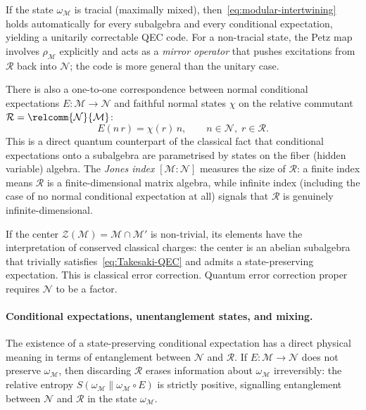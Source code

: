 \documentclass[a4paper,11pt]{article}
\theoremstyle{definition}
\begin{document}
If the state $\omega_\mathcal{M}$ is tracial (maximally mixed), then~\eqref{eq:modular-intertwining}
holds automatically for every subalgebra and every conditional expectation, yielding a
unitarily correctable QEC code.  For a non-tracial state, the Petz map involves $\rho_\mathcal{M}$
explicitly and acts as a \emph{mirror operator} that pushes excitations from $\mathcal{R}$
back into $\mathcal{N}$; the code is more general than the unitary case.

\medskip

There is also a one-to-one correspondence between normal conditional expectations
$E:\mathcal{M}\to\mathcal{N}$ and faithful normal states $\chi$ on the relative commutant
$\mathcal{R}=\relcomm{\mathcal{N}}{\mathcal{M}}$:
\begin{equation}
  E(n\, r) = \chi(r)\, n, \qquad n\in\mathcal{N},\; r\in\mathcal{R}.
  \label{eq:CE-state-correspondence}
\end{equation}
This is a direct quantum counterpart of the classical fact that conditional expectations
onto a subalgebra are parametrised by states on the fiber (hidden variable) algebra.
The \emph{Jones index} $[\mathcal{M}:\mathcal{N}]$ measures the size of $\mathcal{R}$:
a finite index means $\mathcal{R}$ is a finite-dimensional matrix algebra, while infinite
index (including the case of no normal conditional expectation at all) signals that $\mathcal{R}$
is genuinely infinite-dimensional.

If the center $\mathcal{Z}(\mathcal{M})=\mathcal{M}\cap\mathcal{M}'$ is non-trivial,
its elements have the interpretation of conserved classical charges: the center is an
abelian subalgebra that trivially satisfies~\eqref{eq:Takesaki-QEC} and admits a
state-preserving expectation.  This is classical error correction.  Quantum error
correction proper requires $\mathcal{N}$ to be a factor.

\paragraph{Conditional expectations, unentanglement states, and mixing.}
The existence of a state-preserving conditional expectation has a direct physical meaning
in terms of entanglement between $\mathcal{N}$ and $\mathcal{R}$.  If $E:\mathcal{M}\to\mathcal{N}$
does not preserve $\omega_\mathcal{M}$, then discarding $\mathcal{R}$ erases information
about $\omega_\mathcal{M}$ irreversibly: the relative entropy $S(\omega_\mathcal{M}\|\omega_\mathcal{M}\circ E)$
is strictly positive, signalling entanglement between $\mathcal{N}$ and $\mathcal{R}$ in
the state $\omega_\mathcal{M}$.
\end{document}
